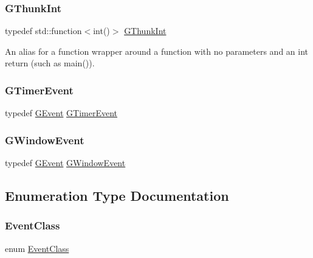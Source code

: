 \subsubsection{\texorpdfstring{G\+Thunk\+Int}{GThunkInt}}
{\footnotesize\ttfamily typedef std\+::function$<$int()$>$ \mbox{\hyperlink{namespacesgl_a2c46348e6e6dbf761bcceddb93945ac3}{G\+Thunk\+Int}}}



An alias for a function wrapper around a function with no parameters and an int return (such as main()). 

\mbox{\label{namespacesgl_a2ca0237e76a4d44e8805aed1d4aeb334}} 
\subsubsection{\texorpdfstring{G\+Timer\+Event}{GTimerEvent}}
{\footnotesize\ttfamily typedef \mbox{\hyperlink{classsgl_1_1GEvent}{G\+Event}} \mbox{\hyperlink{namespacesgl_a2ca0237e76a4d44e8805aed1d4aeb334}{G\+Timer\+Event}}}

\mbox{\label{namespacesgl_a0b7adf9ace5e19350831f5002b7bd970}} 
\subsubsection{\texorpdfstring{G\+Window\+Event}{GWindowEvent}}
{\footnotesize\ttfamily typedef \mbox{\hyperlink{classsgl_1_1GEvent}{G\+Event}} \mbox{\hyperlink{namespacesgl_a0b7adf9ace5e19350831f5002b7bd970}{G\+Window\+Event}}}



\subsection{Enumeration Type Documentation}
\mbox{\label{namespacesgl_a6ff6e8ee75a08092e30167b2b7c5d6f7}} 
\subsubsection{\texorpdfstring{Event\+Class}{EventClass}}
{\footnotesize\ttfamily enum \mbox{\hyperlink{namespacesgl_a6ff6e8ee75a08092e30167b2b7c5d6f7}{Event\+Class}}}



